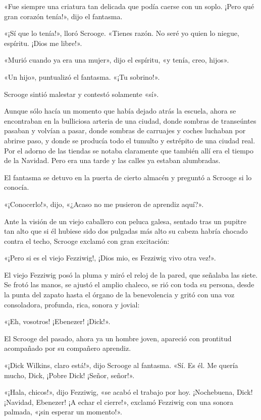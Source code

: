 \documentclass{novela}
\begin{document}
 «Fue siempre una criatura tan delicada que podía caerse con un soplo. ¡Pero qué gran corazón tenía!», dijo el fantasma.

 «¡Sí que lo tenía!», lloró Scrooge. «Tienes razón. No seré yo quien lo niegue, espíritu. ¡Dios me libre!».

 «Murió cuando ya era una mujer», dijo el espíritu, «y tenía, creo, hijos».

 «Un hijo», puntualizó el fantasma. «¡Tu sobrino!».

 Scrooge sintió malestar y contestó solamente «sí».

 Aunque sólo hacía un momento que había dejado atrás la escuela, ahora se encontraban en la bulliciosa arteria de una ciudad, donde sombras de transeúntes pasaban y volvían a pasar, donde sombras de carruajes y coches luchaban por abrirse paso, y donde se producía todo el tumulto y estrépito de una ciudad real. Por el adorno de las tiendas se notaba claramente que también allí era el tiempo de la Navidad. Pero era una tarde y las calles ya estaban alumbradas.

 El fantasma se detuvo en la puerta de cierto almacén y preguntó a Scrooge si lo conocía.

 «¡Conocerlo!», dijo, «¿Acaso no me pusieron de aprendiz aquí?».

 Ante la visión de un viejo caballero con peluca galesa, sentado tras un pupitre tan alto que si él hubiese sido dos pulgadas más alto su cabeza habría chocado contra el techo, Scrooge exclamó con gran excitación:

 «¡Pero si es el viejo Fezziwig!, ¡Dios mio, es Fezziwig vivo otra vez!».

 El viejo Fezziwig posó la pluma y miró el reloj de la pared, que señalaba las siete. Se frotó las manos, se ajustó el amplio chaleco, se rió con toda su persona, desde la punta del zapato hasta el órgano de la benevolencia y gritó con una voz consoladora, profunda, rica, sonora y jovial:

 «¡Eh, vosotros! ¡Ebenezer! ¡Dick!».

 El Scrooge del pasado, ahora ya un hombre joven, apareció con prontitud acompañado por su compañero aprendiz.

 «¡Dick Wilkins, claro está!», dijo Scrooge al fantasma. «Sí. Es él. Me quería mucho, Dick, ¡Pobre Dick! ¡Señor, señor!».
 
 «¡Hala, chicos!», dijo Fezziwig, «se acabó el trabajo por hoy. ¡Nochebuena, Dick! ¡Navidad, Ebenezer! ¡A echar el cierre!», exclamó Fezziwig con una sonora palmada, «¡sin esperar un momento!».
\end{document}
